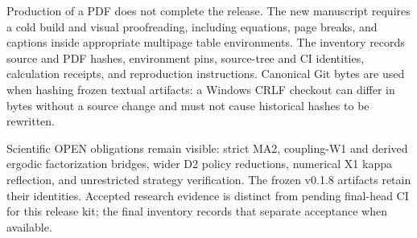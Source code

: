 \documentclass[11pt,a4paper]{article}
\begin{document}
Production of a PDF does not complete the release. The new manuscript requires a cold build and visual proofreading, including equations, page breaks, and captions inside appropriate multipage table environments. The inventory records source and PDF hashes, environment pins, source-tree and CI identities, calculation receipts, and reproduction instructions. Canonical Git bytes are used when hashing frozen textual artifacts: a Windows CRLF checkout can differ in bytes without a source change and must not cause historical hashes to be rewritten.

Scientific OPEN obligations remain visible: strict MA2, coupling-W1 and derived ergodic factorization bridges, wider D2 policy reductions, numerical X1 kappa reflection, and unrestricted strategy verification. The frozen v0.1.8 artifacts retain their identities. Accepted research evidence is distinct from pending final-head CI for this release kit; the final inventory records that separate acceptance when available.
\end{document}
